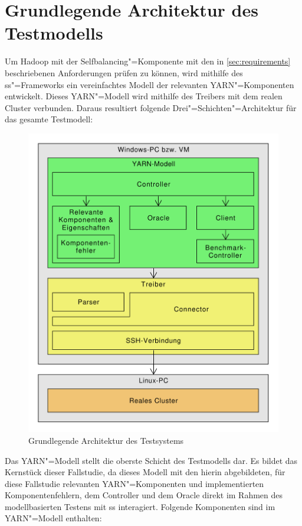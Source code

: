 \section{Grundlegende Architektur des Testmodells}
\label{sec:modelArchitecture}

Um Hadoop mit der Selfbalancing"=Komponente mit den in \cref{sec:requirements} beschriebenen Anforderungen prüfen zu können, wird mithilfe des \ac{ss}"=Frameworks ein vereinfachtes Modell der relevanten \ac{YARN}"=Komponenten entwickelt.
Dieses \ac{YARN}"=Modell wird mithilfe des Treibers mit dem realen Cluster verbunden.
Daraus resultiert folgende Drei"=Schichten"=Architektur für das gesamte Testmodell:

\begin{figure}[h]
    \includegraphics[width=0.6\columnwidth]{./images/modelArchitecture.pdf}
    \caption{Grundlegende Architektur des Testsystems}
    \label{fig:modelArchitecture}
\end{figure}

Das \ac{YARN}"=Modell stellt die oberste Schicht des Testmodells dar.
Es bildet das Kernstück dieser Fallstudie, da dieses Modell mit den hierin abgebildeten, für diese Fallstudie relevanten \ac{YARN}"=Komponenten und implementierten Komponentenfehlern, dem Controller und dem Oracle direkt im Rahmen des modellbasierten Testens mit \ac{ss} interagiert.
Folgende Komponenten sind im \ac{YARN}"=Modell enthalten:


